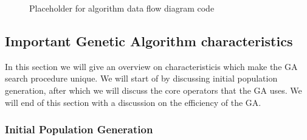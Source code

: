 \begin{figure}[htbp!]
	\centering
	\setlength \fboxsep{0pt}
	\setlength \fboxrule{0.5pt}
	\caption{Placeholder for algorithm data flow diagram code}
	\label{fig:GAFlowDiagram}
\end{figure}
\subsection{Important Genetic Algorithm characteristics}
In this section we will give an overview on characteristicis which make the GA search procedure unique. We will start of by discussing initial population generation, after which we will discuss the core operators that the GA uses. We will end of this section with a discussion on the efficiency of the GA.
\subsubsection{Initial Population Generation}
